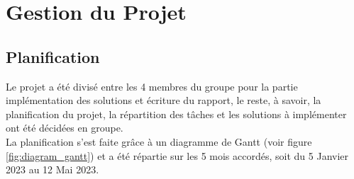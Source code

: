 



\chapter{Gestion du Projet}

\section{Planification}
Le projet a été divisé entre les 4 membres du groupe pour la partie implémentation des solutions et écriture du rapport, le reste, à savoir, la planification du projet, la répartition des tâches et les solutions à implémenter ont été décidées en groupe.\\
La planification s'est faite grâce à un diagramme de Gantt (voir figure \ref{fig:diagram_gantt}) et a été répartie sur les 5 mois accordés, soit du 5 Janvier 2023 au 12 Mai 2023.

